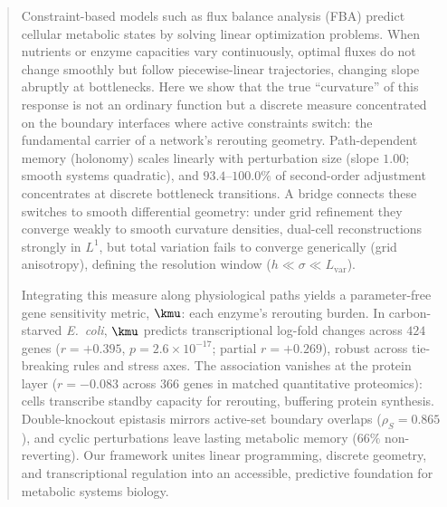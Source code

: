 \begin{abstract}
\noindent
Constraint-based models such as flux balance analysis (FBA) predict cellular
metabolic states by solving linear optimization problems. When
nutrients or enzyme capacities vary continuously, optimal fluxes do
not change smoothly but follow piecewise-linear trajectories, changing slope
abruptly at bottlenecks. Here we show that the true
``curvature'' of this response is not an ordinary function but a
discrete measure concentrated on the boundary interfaces where active
constraints switch: the fundamental carrier of a network's rerouting
geometry. Path-dependent memory (holonomy) scales linearly with
perturbation size (slope $1.00$; smooth systems quadratic), and
$93.4$--$100.0\%$ of second-order adjustment concentrates at discrete
bottleneck transitions. A bridge connects these switches to smooth
differential geometry: under grid refinement they converge weakly to
smooth curvature densities, dual-cell reconstructions strongly in
$L^1$, but total variation fails to converge generically (grid
anisotropy), defining the resolution window ($h \ll \sigma \ll
L_{\mathrm{var}}$).

Integrating this measure along physiological paths yields a
parameter-free gene sensitivity metric, $\kmu$: each enzyme's
rerouting burden. In carbon-starved \emph{E.~coli}, $\kmu$ predicts
transcriptional log-fold changes across $424$ genes ($r = +0.395$,
$p = 2.6 \times 10^{-17}$; partial $r = +0.269$), robust across
tie-breaking rules and stress axes. The association vanishes at the
protein layer ($r = -0.083$ across $366$ genes in matched quantitative
proteomics): cells transcribe standby capacity for rerouting,
buffering protein synthesis. Double-knockout epistasis mirrors
active-set boundary overlaps ($\rho_S = 0.865$), and cyclic
perturbations leave lasting metabolic memory ($66\%$ non-reverting).
Our framework unites linear programming, discrete geometry, and
transcriptional regulation into an accessible, predictive foundation
for metabolic systems biology.
\end{abstract}
